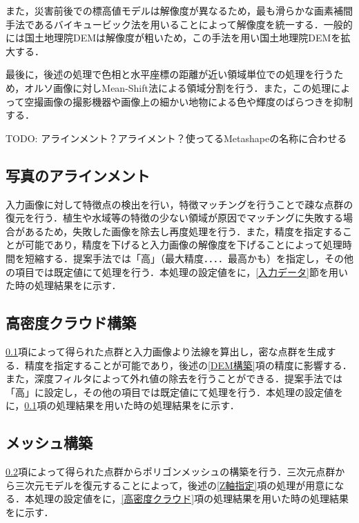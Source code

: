     また，災害前後での標高値モデルは解像度が異なるため，最も滑らかな画素補間手法であるバイキュービック法\cite{論文手法1}を用いることによって解像度を統一する．一般的には国土地理院DEMは解像度が粗いため，この手法を用い国土地理院DEMを拡大する．

    最後に，後述の処理で色相と水平座標の距離が近い領域単位での処理を行うため，オルソ画像に対しMean-Shift法\cite{論文手法2}による領域分割を行う．また，この処理によって空撮画像の撮影機器や画像上の細かい地物による色や輝度のばらつきを抑制する．


    TODO: アラインメント？アライメント？使ってるMetashapeの名称に合わせる
    \subsection{写真のアラインメント}
      \label{写真のアラインメント}
      入力画像に対して特徴点の検出を行い，特徴マッチングを行うことで疎な点群の復元を行う．植生や水域等の特徴の少ない領域が原因でマッチングに失敗する場合があるため，失敗した画像を除去し再度処理を行う．また，精度を指定することが可能であり，精度を下げると入力画像の解像度を下げることによって処理時間を短縮する．提案手法では「高」（最大精度．．．．最高かも）を指定し，その他の項目では既定値にて処理を行う．本処理の設定値を\fref{}に，\ref{入力データ}節を用いた時の処理結果を\fref{}に示す．

    \subsection{高密度クラウド構築}
      \label{高密度クラウド構築}
      \ref{写真のアラインメント}項によって得られた点群と入力画像より法線を算出し，密な点群を生成する．精度を指定することが可能であり，後述の\ref{DEM構築}項の精度に影響する．また，深度フィルタによって外れ値の除去を行うことができる．提案手法では「高」に設定し，その他の項目では既定値にて処理を行う．本処理の設定値を\fref{}に，\ref{写真のアラインメント}項の処理結果を用いた時の処理結果を\fref{}に示す．

    \subsection{メッシュ構築}
      \label{メッシュ構築}
      \ref{高密度クラウド構築}項によって得られた点群からポリゴンメッシュの構築を行う．三次元点群から三次元モデルを復元することによって，後述の\ref{Z軸指定}項の処理が用意になる．本処理の設定値を\fref{}に，\ref{高密度クラウド}項の処理結果を用いた時の処理結果を\fref{}に示す．

